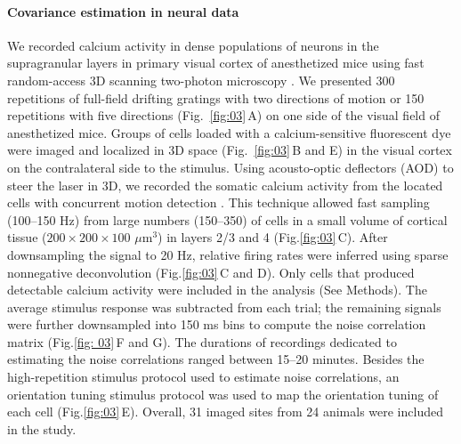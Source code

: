 \documentclass[10pt]{article}
\newcommand{\figref}[2]{Fig.\;\ref{fig:#1}\,#2}
\begin{document}
\paragraph{Covariance estimation in neural data}
We recorded calcium activity in dense populations of neurons in the supragranular layers in primary visual cortex of anesthetized mice using fast random-access 3D scanning two-photon microscopy \cite{Reddy:2005,Katona:2012,Cotton:2013}. We presented 300 repetitions of full-field drifting gratings with two directions of motion or 150 repetitions with five directions (Fig.~\ref{fig:03}\,A) on one side of the visual field of anesthetized mice. Groups of cells loaded with a calcium-sensitive fluorescent dye were imaged and localized in 3D space (Fig.~\ref{fig:03}\,B and E) in the visual cortex on the contralateral side to the stimulus. Using acousto-optic deflectors (AOD) to steer the laser in 3D,  we recorded the somatic calcium activity from the located cells with concurrent motion detection \cite{Ecker:2013}.  This technique allowed fast sampling (100--150 Hz) from large numbers (150--350) of cells in a small volume of cortical tissue ($200\times200\times100$ $\mu$m$^3$) in layers 2/3 and 4 (\figref{03}{C}). After downsampling the signal to 20 Hz, relative firing rates were inferred using sparse nonnegative deconvolution \cite{Vogelstein:2010} (\figref{03}{C and D}). Only cells that produced detectable calcium activity were included in the analysis (See Methods). The average stimulus response was subtracted from each trial; the remaining signals were further downsampled into 150 ms bins to compute the noise correlation matrix (\figref{ 03}{F and G}). The durations of recordings dedicated to estimating the noise correlations ranged between 15--20 minutes.  Besides the high-repetition stimulus protocol used to estimate noise correlations, an orientation tuning stimulus protocol was used to map the orientation tuning of each cell (\figref{03}{E}). Overall, 31 imaged sites from 24 animals were included in the study.
\end{document}
